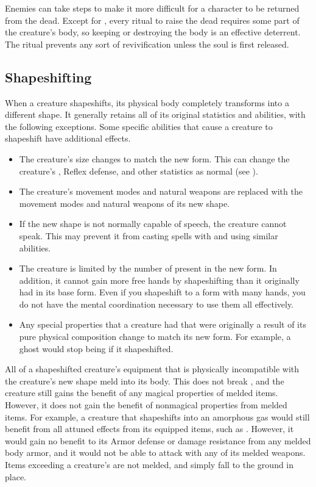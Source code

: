    Enemies can take steps to make it more difficult for a character to be returned from the dead.
    Except for , every ritual to raise the dead requires some part of the creature's body, so keeping or destroying the body is an effective deterrent.
    The  ritual prevents any sort of revivification unless the soul is first released.

  \subsection{Shapeshifting}\label{Shapeshifting}
    When a creature shapeshifts, its physical body completely transforms into a different shape.
    It generally retains all of its original statistics and abilities, with the following exceptions.
    Some specific abilities that cause a creature to shapeshift have additional effects.
    \begin{itemize}
      \item The creature's size changes to match the new form.
        This can change the creature's , Reflex defense, and other statistics as normal (see ).
      \item The creature's  movement modes and natural weapons are replaced with the movement modes and natural weapons of its new shape.
      \item If the new shape is not normally capable of speech, the creature cannot speak.
        This may prevent it from casting spells with  and using similar abilities.
      \item The creature is limited by the number of  present in the new form.
        In addition, it cannot gain more free hands by shapeshifting than it originally had in its base form.
        Even if you shapeshift to a form with many hands, you do not have the mental coordination necessary to use them all effectively.
      \item Any special properties that a creature had that were originally a result of its pure physical composition change to match its new form.
        For example, a ghost would stop being  if it shapeshifted.
    \end{itemize}

    All of a shapeshifted creature's equipment that is physically incompatible with the creature's new shape meld into its body.
    This does not break , and the creature still gains the benefit of any magical properties of melded items.
    However, it does not gain the benefit of nonmagical properties from melded items.
    For example, a creature that shapeshifts into an amorphous gas would still benefit from all attuned effects from its equipped items, such as .
    However, it would gain no benefit to its Armor defense or damage resistance from any melded body armor, and it would not be able to attack with any of its melded weapons.
    Items exceeding a creature's  are not melded, and simply fall to the ground in place.

